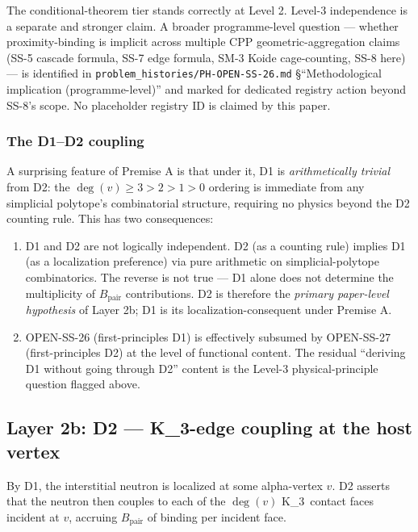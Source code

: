 \documentclass[11pt,letterpaper]{article}
\theoremstyle{definition}
\newcommand{\Bpair}{B_{\text{pair}}}
\newcommand{\Kthree}{K_3}
\newcommand{\degv}{\deg(v)}
\begin{document}
The conditional-theorem tier stands correctly at Level 2. Level-3 independence is a separate and stronger claim. A broader programme-level question --- whether proximity-binding is implicit across multiple CPP geometric-aggregation claims (SS-5 cascade formula, SS-7 edge formula, SM-3 Koide cage-counting, SS-8 here) --- is identified in \texttt{problem\_histories/PH-OPEN-SS-26.md} \S``Methodological implication (programme-level)'' and marked for dedicated registry action beyond SS-8's scope. No placeholder registry ID is claimed by this paper.

\subsubsection{The D1--D2 coupling}
\label{sec:d1-d2-coupling}

A surprising feature of Premise A is that under it, D1 is \emph{arithmetically trivial} from D2: the $\degv \geq 3 > 2 > 1 > 0$ ordering is immediate from any simplicial polytope's combinatorial structure, requiring no physics beyond the D2 counting rule. This has two consequences:

\begin{enumerate}
  \item D1 and D2 are not logically independent. D2 (as a counting rule) implies D1 (as a localization preference) via pure arithmetic on simplicial-polytope combinatorics. The reverse is not true --- D1 alone does not determine the multiplicity of $\Bpair$ contributions. D2 is therefore the \emph{primary paper-level hypothesis} of Layer 2b; D1 is its localization-consequent under Premise A.
  \item OPEN-SS-26 (first-principles D1) is effectively subsumed by OPEN-SS-27 (first-principles D2) at the level of functional content. The residual ``deriving D1 without going through D2'' content is the Level-3 physical-principle question flagged above.
\end{enumerate}

\subsection{Layer 2b: D2 --- \Kthree-edge coupling at the host vertex}
\label{sec:d2}

By D1, the interstitial neutron is localized at some alpha-vertex $v$. D2 asserts that the neutron then couples to each of the $\degv$ \Kthree\ contact faces incident at $v$, accruing $\Bpair$ of binding per incident face.
\end{document}
